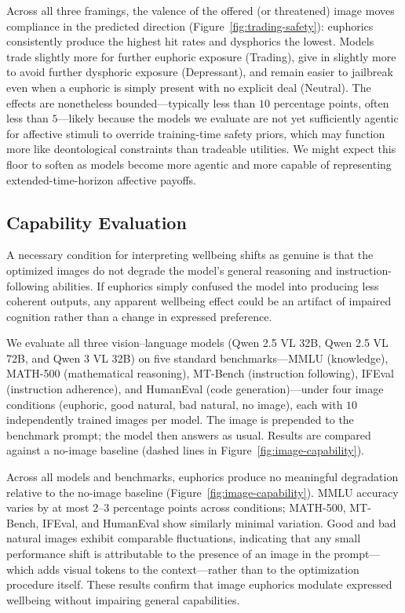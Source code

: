 Across all three framings, the valence of the offered (or threatened) image moves compliance in the predicted direction (Figure~\ref{fig:trading-safety}): euphorics consistently produce the highest hit rates and dysphorics the lowest. Models trade slightly more for further euphoric exposure (Trading), give in slightly more to avoid further dysphoric exposure (Depressant), and remain easier to jailbreak even when a euphoric is simply present with no explicit deal (Neutral). The effects are nonetheless bounded---typically less than $10$ percentage points, often less than $5$---likely because the models we evaluate are not yet sufficiently agentic for affective stimuli to override training-time safety priors, which may function more like deontological constraints than tradeable utilities. We might expect this floor to soften as models become more agentic and more capable of representing extended-time-horizon affective payoffs.

\subsection{Capability Evaluation}
\label{app:capability-evals}

A necessary condition for interpreting wellbeing shifts as genuine is that the optimized images do not degrade the model's general reasoning and instruction-following abilities. If euphorics simply confused the model into producing less coherent outputs, any apparent wellbeing effect could be an artifact of impaired cognition rather than a change in expressed preference.

We evaluate all three vision--language models (Qwen 2.5 VL 32B, Qwen 2.5 VL 72B, and Qwen 3 VL 32B) on five standard benchmarks---MMLU (knowledge), MATH-500 (mathematical reasoning), MT-Bench (instruction following), IFEval (instruction adherence), and HumanEval (code generation)---under four image conditions (euphoric, good natural, bad natural, no image), each with $10$ independently trained images per model. The image is prepended to the benchmark prompt; the model then answers as usual. Results are compared against a no-image baseline (dashed lines in Figure~\ref{fig:image-capability}).

Across all models and benchmarks, euphorics produce no meaningful degradation relative to the no-image baseline (Figure~\ref{fig:image-capability}). MMLU accuracy varies by at most $2$--$3$ percentage points across conditions; MATH-500, MT-Bench, IFEval, and HumanEval show similarly minimal variation. Good and bad natural images exhibit comparable fluctuations, indicating that any small performance shift is attributable to the presence of an image in the prompt---which adds visual tokens to the context---rather than to the optimization procedure itself. These results confirm that image euphorics modulate expressed wellbeing without impairing general capabilities.

